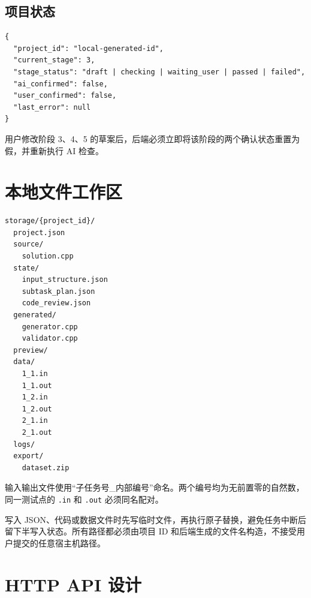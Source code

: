 \documentclass[UTF8,zihao=-4]{ctexart}
\begin{document}
\subsection{项目状态}

\begin{lstlisting}
{
  "project_id": "local-generated-id",
  "current_stage": 3,
  "stage_status": "draft | checking | waiting_user | passed | failed",
  "ai_confirmed": false,
  "user_confirmed": false,
  "last_error": null
}
\end{lstlisting}

用户修改阶段 3、4、5 的草案后，后端必须立即将该阶段的两个确认状态重置为假，并重新执行 AI 检查。

\section{本地文件工作区}

\begin{lstlisting}
storage/{project_id}/
  project.json
  source/
    solution.cpp
  state/
    input_structure.json
    subtask_plan.json
    code_review.json
  generated/
    generator.cpp
    validator.cpp
  preview/
  data/
    1_1.in
    1_1.out
    1_2.in
    1_2.out
    2_1.in
    2_1.out
  logs/
  export/
    dataset.zip
\end{lstlisting}

输入输出文件使用“子任务号\_内部编号”命名。两个编号均为无前置零的自然数，同一测试点的 \texttt{.in} 和 \texttt{.out} 必须同名配对。

写入 JSON、代码或数据文件时先写临时文件，再执行原子替换，避免任务中断后留下半写入状态。所有路径都必须由项目 ID 和后端生成的文件名构造，不接受用户提交的任意宿主机路径。

\section{HTTP API 设计}
\end{document}
